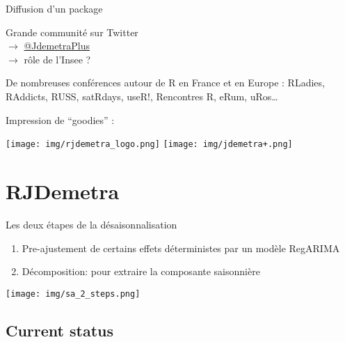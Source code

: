 \documentclass[10pt,xcolor=table,color={dvipsnames,usenames},ignorenonframetext,usepdftitle=false,french]{beamer}
\begin{document}
\begin{frame}{Diffusion d'un package}
\protect\hypertarget{diffusion-dun-package}{}

Grande communité \large\faRProject{} \normalsize sur Twitter\\
\(\rightarrow\)
\href{https://twitter.com/JDemetraPlus}{\faTwitter{} @JdemetraPlus}\\
\(\rightarrow\) rôle de l'Insee ?

De nombreuses conférences autour de R en France et en Europe : RLadies,
RAddicts, RUSS, satRdays, useR!, Rencontres R, eRum, uRos\ldots{}

Impression de ``goodies'' :

\texttt{[image: img/rjdemetra\_logo.png]}
\texttt{[image: img/jdemetra+.png]}

\end{frame}

\hypertarget{rjdemetra}{%
\section{RJDemetra}\label{rjdemetra}}

\begin{frame}{Les deux étapes de la désaisonnalisation}
\protect\hypertarget{les-deux-etapes-de-la-desaisonnalisation}{}

\vspace{-0.15cm}

\begin{enumerate}
\item
  Pre-ajustement de certains effets déterministes par un modèle RegARIMA
\item
  Décomposition: pour extraire la composante saisonnière
\end{enumerate}

\centering

\texttt{[image: img/sa\_2\_steps.png]}

\end{frame}

\hypertarget{current-status}{%
\subsection{Current status}\label{current-status}}
\end{document}
